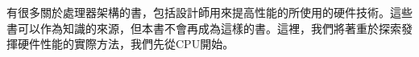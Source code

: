 有很多關於處理器架構的書，包括設計師用來提高性能的所使用的硬件技術。這些書可以作為知識的來源，但本書不會再成為這樣的書。這裡，我們將著重於探索發揮硬件性能的實際方法，我們先從CPU開始。













































